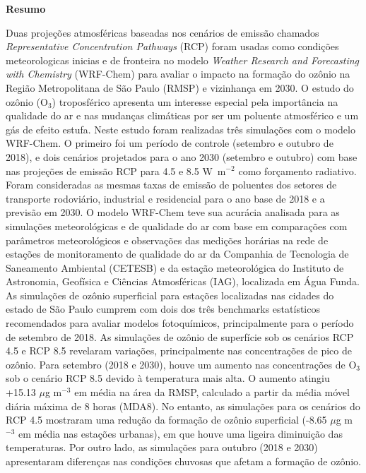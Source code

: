 \begin{spacing}{1.5}
		\begin{center}
			\LARGE \textbf{Resumo}\\[2cm]
		\end{center}
			Duas projeções atmosféricas baseadas nos cenários de emissão chamados \textit{Representative Concentration Pathways} (RCP) foram usadas como condições meteorologicas inicias e de fronteira no modelo \textit{Weather Research and Forecasting with Chemistry} (WRF-Chem) para avaliar o impacto na formação do ozônio na Região Metropolitana de São Paulo (RMSP) e vizinhança em 2030.
			O estudo do ozônio (O$_3$) troposférico apresenta um interesse especial pela importância na qualidade do ar e nas mudanças climáticas por ser um poluente atmosférico e um gás de efeito estufa.
			Neste estudo foram realizadas três simulações com o modelo WRF-Chem. O primeiro foi um período de controle (setembro e outubro de 2018), e dois cenários projetados para o ano 2030 (setembro e outubro) com base nas projeções de emissão RCP para 4.5 e 8.5 W~m$^{-2}$ como forçamento radiativo.	Foram consideradas as mesmas taxas de emissão de poluentes dos setores de transporte rodoviário, industrial e residencial para o ano base de 2018 e a previsão em 2030.
			O modelo WRF-Chem teve sua acurácia analisada para as simulações meteorológicas e de qualidade do ar com base em comparações com parâmetros meteorológicos e observações das medições horárias na rede de estações de monitoramento de qualidade do ar da Companhia de Tecnologia de Saneamento Ambiental (CETESB) e da estação meteorológica do Instituto de Astronomia, Geofísica e Ciências Atmosféricas (IAG), localizada em Água Funda.
			As simulações de ozônio superficial para estações localizadas nas cidades do estado de São Paulo cumprem com dois dos três benchmarks estatísticos recomendados para avaliar modelos fotoquímicos, principalmente para o período de setembro de 2018. As simulações de ozônio de superfície sob os cenários RCP 4.5 e RCP 8.5 revelaram variações, principalmente nas concentrações de pico de ozônio. Para setembro (2018 e 2030), houve um aumento nas concentrações de O$_3$ sob o cenário RCP 8.5 devido à temperatura mais alta. O aumento atingiu +15.13 $\mu$g m$^{-3}$ em média na área da RMSP, calculado a partir da média móvel diária máxima de 8 horas (MDA8). No entanto, as simulações para os cenários do RCP 4.5 mostraram uma redução da formação de ozônio superficial (-8.65 $\mu$g m$^{-3}$ em média nas estações urbanas), em que houve uma ligeira diminuição das temperaturas. Por outro lado, as simulações para outubro (2018 e 2030) apresentaram diferenças nas condições chuvosas que afetam a formação de ozônio. 

\end{spacing}
